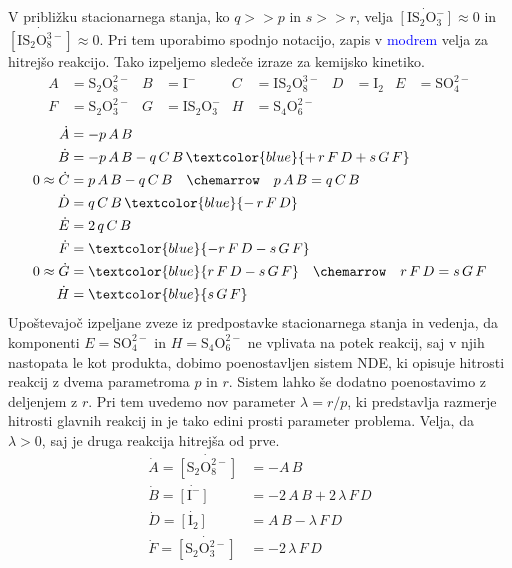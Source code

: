 V približku stacionarnega stanja, ko $q >> p$ in $s>>r$, velja $\dot{[\text{I}\text{S}_2\text{O}_3^{-}]} \approx0$ in $\dot{[\text{I}\text{S}_2\text{O}_8^{3-}]}\approx0$. Pri tem uporabimo spodnjo notacijo, zapis v \textcolor{blue}{modrem} velja za hitrejšo reakcijo. Tako izpeljemo sledeče izraze za kemijsko kinetiko.
\begin{align}
    A&=\text{S}_2\text{O}_8^{2-} &
    B&=\text{I}^- &
    C&=\text{I}\text{S}_2\text{O}_8^{3-} &
    D&=\text{I}_2 &
    E&=\text{S}\text{O}_4^{2-} \\ \nonumber
    F&=\text{S}_2\text{O}_3^{2-} &
    G&=\text{I}\text{S}_2\text{O}_3^{-} &
    H&=\text{S}_4\text{O}_6^{2-}
\end{align}
\begin{align}
    \dot{A} &= -p\,A\,B \\ \nonumber
    \dot{B} &= -p\,A\,B - q\,C\,B \,\textcolor{blue}{ + \,r\,F\,D + s\,G\,F} \\ \nonumber
    0 \approx \dot{C} &= p\,A\,B - q\,C\,B \quad \chemarrow \quad p\,A\,B = q\,C\,B \\ \nonumber
    \dot{D} &= q\,C\,B \, \textcolor{blue}{-\,r\,F\,D} \\ \nonumber
    \dot{E} &= 2\,q\,C\,B \\ \nonumber
    \dot{F} &= \textcolor{blue}{ -r\,F\,D - s\,G\,F} \\ \nonumber
    0 \approx \dot{G} &= \textcolor{blue}{r\,F\,D - s\,G\,F} \quad \chemarrow \quad r\,F\,D = s\,G\,F \\ \nonumber
    \dot{H} &= \textcolor{blue}{s\,G\,F}
\end{align}
Upoštevajoč izpeljane zveze iz predpostavke stacionarnega stanja in vedenja, da komponenti $E=\text{S}\text{O}_4^{2-}$ in $H=\text{S}_4\text{O}_6^{2-}$ ne vplivata na potek reakcij, saj v njih nastopata le kot produkta, dobimo poenostavljen sistem NDE, ki opisuje hitrosti reakcij z dvema parametroma $p$ in $r$. Sistem lahko še dodatno poenostavimo z deljenjem z $r$. Pri tem uvedemo nov parameter $\lambda = r/p$, ki predstavlja razmerje hitrosti glavnih reakcij in je tako edini prosti parameter problema. Velja, da $\lambda >0$, saj je druga reakcija hitrejša od prve.
\begin{align}
    \dot{A}=\dot{[\text{S}_2\text{O}_8^{2-}]} &= -A\,B \\ \nonumber
    \dot{B}=\dot{[\text{I}^-]} &= -2\,A\,B + 2\,\lambda\,F\,D \\ \nonumber
    \dot{D}=\dot{[\text{I}_2]} &= A\,B -\lambda\,F\,D \\ \nonumber
    \dot{F}=\dot{[\text{S}_2\text{O}_3^{2-}]} &= -2\,\lambda\,F\,D
\end{align}

